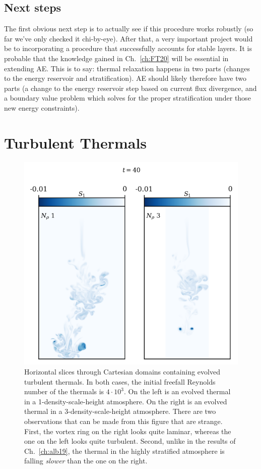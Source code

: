 \subsection{Next steps}
The first obvious next step is to actually see if this procedure works robustly (so far we've only checked it chi-by-eye).
After that, a very important project would be to incorporating a procedure that successfully accounts for stable layers.
It is probable that the knowledge gained in Ch.~\ref{ch:FT20} will be essential in extending AE.
This is to say: thermal relaxation happens in two parts (changes to the energy reservoir and stratification).
AE should likely therefore have two parts (a change to the energy reservoir step based on current flux divergence, and a boundary value problem which solves for the proper stratification under those new energy constraints).

\section{Turbulent Thermals}
\label{sec:turb_thermals}
\begin{figure}[p!]
    \includegraphics[width=\textwidth]{figs/unpublished/turbulent_thermals.pdf}
    \caption[Evolved turbulent thermals]{
	Horizontal slices through Cartesian domains containing evolved turbulent thermals.
	In both cases, the initial freefall Reynolds number of the thermals is $4\cdot10^3$.
	On the left is an evolved thermal in a 1-density-scale-height atmosphere.
	On the right is an evolved thermal in a 3-density-scale-height atmosphere.
	There are two observations that can be made from this figure that are strange.
	First, the vortex ring on the right looks quite laminar, whereas the one on the left looks quite turbulent.
	Second, unlike in the results of Ch.~\ref{ch:alb19}, the thermal in the highly stratified atmosphere is falling \emph{slower} than the one on the right.
    \label{fig:turbulent_thermals} }
\end{figure}


